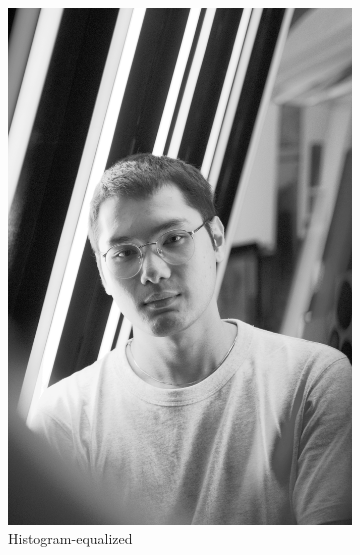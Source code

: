 \documentclass[12pt,a4paper]{article}
\begin{document}
\begin{figure}[htb]
\begin{subfigure}[h!]{0.24\textwidth}
		\includegraphics[width=\textwidth]{hist_equal.png}
		\caption{Histogram-equalized}
		\label{fig:hist-eq}
	\end{subfigure}
	\begin{subfigure}[h!]{0.24\textwidth}
		\centering

\end{subfigure}
\end{figure}
\end{document}
